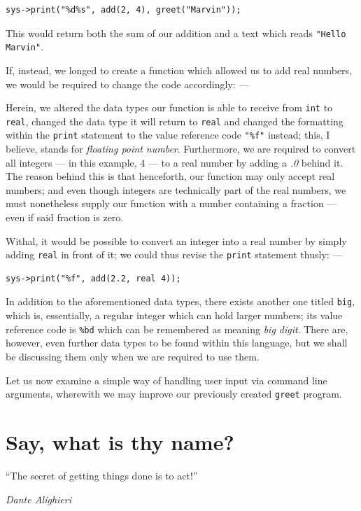 \documentclass[a5paper,twoside,12pt]{report}
\begin{document}
\begin{lstlisting}
sys->print("%d%s", add(2, 4), greet("Marvin"));
\end{lstlisting}

This would return both the sum of our addition and a text which reads \texttt{"Hello Marvin"}.

If, instead, we longed to create a function which allowed us to add real numbers, we would be required to change the code accordingly: —



Herein, we altered the data types our function is able to receive from \texttt{int} to \texttt{real}, changed the data type it will return to \texttt{real} and changed the formatting within the \texttt{print} statement to the value reference code \texttt{"\%f"} instead; this, I believe, stands for \textit{floating point number}. Furthermore, we are required to convert all integers — in this example, 4 — to a real number by adding a \textit{.0} behind it. The reason behind this is that henceforth, our function may only accept real numbers; and even though integers are technically part of the real numbers, we must nonetheless supply our function with a number containing a fraction — even if said fraction is zero.

Withal, it would be possible to convert an integer into a real number by simply adding \texttt{real} in front of it; we could thus revise the \texttt{print} statement thusly: —

\begin{lstlisting}
sys->print("%f", add(2.2, real 4));
\end{lstlisting}

In addition to the aforementioned data types, there exists another one titled \texttt{big}, which is, essentially, a regular integer which can hold larger numbers; its value reference code is \texttt{\%bd} which can be remembered as meaning \textit{big digit}. There are, however, even further data types to be found within this language, but we shall be discussing them only when we are required to use them.

Let us now examine a simple way of handling user input via command line arguments, wherewith we may improve our previously created \texttt{greet} program.

\chapter*{Say, what is thy name?}
\epigraph{``The secret of getting things done is to act!''}{\textit{Dante Alighieri}}
\end{document}
